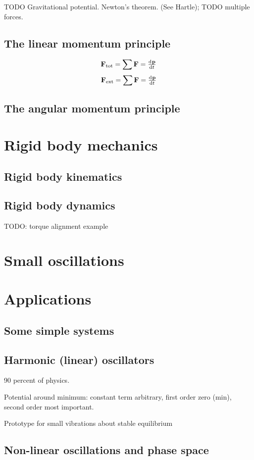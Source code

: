 TODO Gravitational potential. Newton's theorem. (See Hartle); TODO multiple forces.
\section{The linear momentum principle}
\[ \vec{F}_{\text{tot}} = \sum \vec{F} = \od{\vec{p}}{t} \]
\[ \vec{F}_{\text{ext}} = \sum \vec{F} = \od{\vec{p}}{t} \]
\section{The angular momentum principle}

\chapter{Rigid body mechanics}
\section{Rigid body kinematics}
\section{Rigid body dynamics}
TODO: torque alignment example

\chapter{Small oscillations}

\chapter{Applications}
\section{Some simple systems}

\section{Harmonic (linear) oscillators}
90 percent of physics.

Potential around minimum: constant term arbitrary, first order zero (min), second order most important.

Prototype for small vibrations about stable equilibrium


\section{Non-linear oscillations and phase space}


